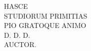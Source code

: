 \vspace*{0.25\textheight}
\begin{center}
HASCE\\[0.6em]
STUDIORUM PRIMITIAS\\[0.6em]
PIO GRATOQUE ANIMO\\[1.2em]
D. D. D.\\[1.0em]
AUCTOR.
\end{center}
